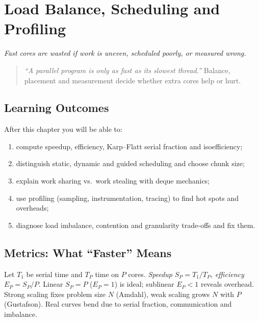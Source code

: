 \chapter{Load Balance, Scheduling and Profiling}\label{ch:performance}
\begin{center}\small\textit{Fast cores are wasted if work is uneven, scheduled poorly, or measured wrong.}\end{center}

\begin{quote}
\emph{``A parallel program is only as fast as its slowest thread.''} Balance, placement and measurement decide whether extra cores help or hurt.
\end{quote}

\noindent{}
\vspace{0.4em}

\section*{Learning Outcomes}
After this chapter you will be able to:
\begin{enumerate}[label=(L\arabic*)]
    \item compute speedup, efficiency, Karp--Flatt serial fraction and isoefficiency;
    \item distinguish static, dynamic and guided scheduling and choose chunk size;
    \item explain work sharing vs.\ work stealing with deque mechanics;
    \item use profiling (sampling, instrumentation, tracing) to find hot spots and overheads;
    \item diagnose load imbalance, contention and granularity trade-offs and fix them.
\end{enumerate}

\section{Metrics: What ``Faster'' Means}\label{sec:metrics}
Let $T_1$ be serial time and $T_P$ time on $P$ cores. \emph{Speedup} $S_P=T_1/T_P$, \emph{efficiency} $E_P=S_P/P$. Linear $S_P=P$ ($E_P=1$) is ideal; sublinear $E_P<1$ reveals overhead. Strong scaling fixes problem size $N$ (Amdahl), weak scaling grows $N$ with $P$ (Gustafson). Real curves bend due to serial fraction, communication and imbalance.

